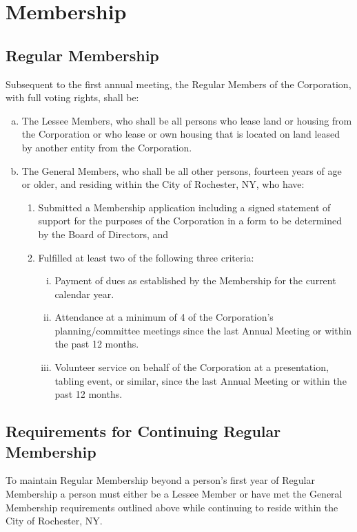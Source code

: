 \section{Membership}
\label{sec:membership}

\subsection{Regular Membership}
Subsequent to the first annual meeting, the Regular Members of the
Corporation, with full voting rights, shall be:
\begin{enumerate}[a.]
\item The Lessee Members, who shall be all persons who lease land or
  housing from the Corporation or who lease or own housing that is
  located on land leased by another entity from the Corporation.
\item The General Members, who shall be all other persons, fourteen
  years of age or older, and residing within the City of Rochester,
  NY, who have:
  \begin{enumerate}[(1)]
  \item Submitted a Membership application including a signed
    statement of support for the purposes of the Corporation in a form
    to be determined by the Board of Directors, and
  \item Fulfilled at least two of the following three criteria:
    \begin{enumerate}[i.]
      \item Payment of dues as established by the Membership for the
        current calendar year.
      \item Attendance at a minimum of 4 of the Corporation's
        planning/committee meetings since the last Annual Meeting or
        within the past 12 months.
      \item Volunteer service on behalf of the Corporation at a
        presentation, tabling event, or similar, since the last Annual
        Meeting or within the past 12 months.
    \end{enumerate}
  \end{enumerate}
\end{enumerate}

\subsection{Requirements for Continuing Regular Membership}
To maintain Regular Membership beyond a person’s first year of Regular
Membership a person must either be a Lessee Member or have met the
General Membership requirements outlined above while continuing to
reside within the City of Rochester, NY.

